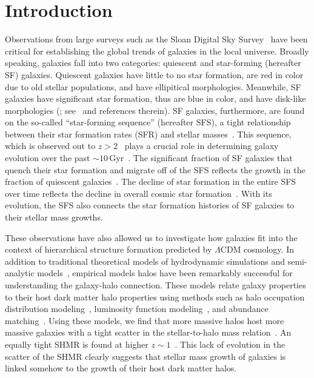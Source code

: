 \documentclass[12pt, letterpaper, preprint, tighten]{aastex62}
\newcommand{\edt}[1]{{\color{dred}{\bf} #1}}
\begin{document}
\section{Introduction}
Observations from large surveys such as the Sloan Digital Sky Survey~\citep[SDSS;][]{york2000}
have been critical for establishing the global trends of galaxies in
the local universe. Broadly speaking, galaxies fall into two categories:
quiescent and star-forming (hereafter SF) galaxies. Quiescent galaxies
have little to no star formation, are red in color
\edt{due to old stellar populations},
and have ellipitical
morphologies. Meanwhile, SF galaxies have significant star formation,
\edt{thus}
are blue in color, and have disk-like morphologies (\citealt{kauffmann2003, blanton2003, baldry2006, taylor2009, moustakas2013};
see~\citealt{blanton2009} and references therein).
SF galaxies, furthermore, are found on the so-called ``star-forming sequence''
(hereafter SFS), a tight relationship between their star formation rates (SFR)
and stellar masses~\citep[][see also Figure~\ref{fig:groupcat}]{noeske2007, daddi2007, salim2007, speagle2014, lee2015}.
This sequence, which is observed out to $z > 2$~\citep{wang2013, leja2015}
plays a crucial role in
\edt{determining}
galaxy evolution over the past ${\sim}10\,\mathrm{Gyr}$~\citep[see][for an alternative point of view]{kelson2014,abramson2016}.
The significant fraction of SF galaxies that quench their
star formation and migrate off of the SFS reflects the growth in the
fraction of quiescent galaxies~\citep{blanton2006, borch2006, bundy2006, moustakas2013}.
The decline of star formation in the entire SFS~\citep{lee2015, schreiber2015}
over time reflects the decline in overall cosmic star formation~\citep{hopkins2006, behroozi2013, madau2014}.
With its evolution, the SFS also connects the star formation histories of SF
galaxies to their stellar mass growths.

These observations have also allowed us to investigate how galaxies fit
into the context of hierarchical structure formation predicted
by $\Lambda$CDM cosmology. In addition to traditional theoretical
models of hydrodynamic simulations and semi-analytic
models~\citep[see][for reviews]{silk2012, somerville2015},
empirical models halos have been remarkably successful for
understanding the galaxy-halo connection. These models relate galaxy
properties to their host dark matter halo properties using methods such as
halo occupation distribution modeling~\citep[HOD; \emph{e.g.}][]{zheng2007,zehavi2011,leauthaud2012,parejko2013,zu2015},
luminosity function modeling~\citep[\emph{e.g.}][]{yang2009}, and abundance
matching~\citep[\emph{e.g.}][]{kravtsov2004, vale2006, conroy2009, moster2013, reddick2013}.
Using these models, we find that more massive halos host more
massive galaxies with a tight scatter in the stellar-to-halo
mass relation~\citep[hereafter SHMR;][]{mandelbaum2006a, conroy2007, more2011, leauthaud2012, tinker2013, velander2014, han2015, zu2015, gu2016, lange2018a}. An equally tight SHMR is found at higher
$z\sim1$~\citep{leauthaud2012, tinker2013, patel2015}. This lack of
evolution in the scatter of the SHMR clearly suggests that stellar
mass growth of galaxies is linked somehow to the growth
of their host dark matter halos.
\end{document}
